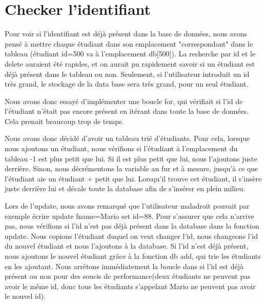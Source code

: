 \documentclass[utf8]{article}
\begin{document}
\section{Checker l'identifiant}
\indent{}
\par
Pour voir si l'identifiant est déjà présent dans la base de données, nous avons pensé à mettre chaque étudiant
dans son emplacement "correspondant" dans le tableau (étudiant id=500 va à l'emplacement db[500]). La recherche par id et le delete auraient été rapides, et on 
aurait pu rapidement savoir si un étudiant est déjà présent dans le tableau ou non.
Seulement, si l'utilisateur introduit un id très grand, le stockage de la data base sera très grand, pour un seul étudiant.
\par
\indent{}
\par
Nous avons donc essayé d'implémenter une boucle for, qui vérifiait si l'id de l'étudiant n'était pas encore présent en itérant dans toute la base de données.
Cela prenait beaucoup trop de temps. 
\par
\indent{}
\par
Nous avons donc décidé d'avoir un tableau trié d'étudiants. Pour cela, lorsque nous ajoutons un étudiant,
nous vérifions si l'étudiant à l'emplacement du tableau -1 est plus petit que lui. Si il est plus petit que lui, nous l'ajoutons juste derrière. Sinon, 
nous décrémentons la variable au fur et à mesure, jusqu'à ce que l'étudiant aie un étudiant + petit que lui. Lorsqu'il trouve cet étudiant, il s'insère juste derrière lui
et décale toute la database afin de s'insérer en plein milieu.
\par
\indent{}
\par
Lors de l'update, nous avons remarqué que l'utilisateur maladroit pouvait par exemple écrire update fname=Mario set id=88.
Pour s'assurer que cela n'arrive pas, nous vérifions si l'id n'est pas déjà présent dans la database dans la fonction update.
Nous copions l'étudiant duquel on veut changer l'id, nous changeons l'id du nouvel étudiant et nous l'ajoutons à la database. Si l'id 
n'est déjà présent, nous ajoutons le nouvel étudiant grâce à la fonction db add, qui trie les étudiants en les ajoutant.
Nous arrêtons immédiatement la boucle dans si l'id est déjà présent ou non pour des soucis de performance(deux étudiants ne peuvent pas avoir le même id, 
donc tous les étudiants s'appelant Mario ne peuvent pas avoir le nouvel id). 
\par
\end{document}
